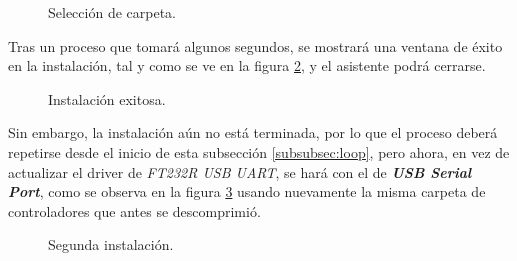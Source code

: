 \begin{figure}[H] %
\caption{Selección de carpeta.}
\label{fig:Subf}
\end{figure}

Tras un proceso que tomará algunos segundos, se mostrará una ventana de éxito en la instalación, tal y como se ve en la figura \ref{fig:Inst1}, y el asistente podrá cerrarse.

\begin{figure}[H] %
\caption{Instalación exitosa.}
\label{fig:Inst1}
\end{figure}

Sin embargo, la instalación aún no está terminada, por lo que el proceso deberá repetirse desde el inicio de esta subsección \ref{subsubsec:loop}, pero ahora, en vez de actualizar el driver de \textit{FT232R USB UART}, se hará con el de \textit{\textbf{USB Serial Port}}, como se observa en la figura \ref{fig:Inst2} usando nuevamente la misma carpeta de controladores que antes se descomprimió.

\begin{figure}[H] %
\caption{Segunda instalación.}
\label{fig:Inst2}
\end{figure}

